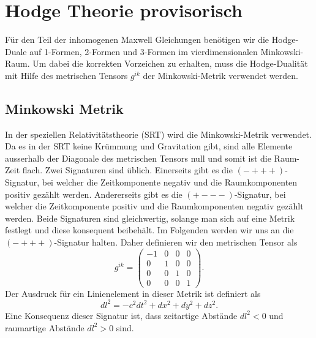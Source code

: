 %
%
%
%
\section{Hodge Theorie provisorisch
\label{maxwell:section:teil1}}

Für den Teil der inhomogenen Maxwell Gleichungen benötigen wir die Hodge-Duale auf 1-Formen, 2-Formen und 3-Formen im vierdimensionalen Minkowski-Raum.
Um dabei die korrekten Vorzeichen zu erhalten, muss die Hodge-Dualität mit Hilfe des metrischen Tensors $g^{ik}$  der Minkowski-Metrik verwendet werden.



\subsection{Minkowski Metrik}
In der speziellen Relativitätstheorie (SRT) wird die Minkowski-Metrik verwendet.
Da es in der SRT keine Krümmung und Gravitation gibt, sind alle Elemente ausserhalb der Diagonale des metrischen Tensors null und somit ist die Raum-Zeit flach.
Zwei Signaturen sind üblich.
Einerseits gibt es die $(-+++)$-Signatur, bei welcher die Zeitkomponente negativ und die Raumkomponenten positiv gezählt werden.
Andererseits gibt es die $(+---)$-Signatur, bei welcher die Zeitkomponente positiv und die Raumkomponenten negativ gezählt werden.
Beide Signaturen sind gleichwertig, solange man sich auf eine Metrik festlegt und diese konsequent beibehält.
Im Folgenden werden wir uns an die $(-+++)$-Signatur halten.
Daher definieren wir den metrischen Tensor als
\begin{equation}
	g^{ik} = \begin{pmatrix}
		-1 & 0 & 0 & 0 \\ 0 & 1 & 0 & 0 \\ 0 & 0 & 1 & 0 \\ 0 & 0 & 0 & 1 
	\end{pmatrix}.
	\label{maxwell:section:teil1:metrik}
\end{equation}
Der Ausdruck für ein Linienelement in dieser Metrik ist definiert als
\begin{equation}
	dl^2 = -c^2dt^2 +dx^2+dy^2+dz^2.
\end{equation}
Eine Konsequenz dieser Signatur ist, dass zeitartige Abstände $dl^2 < 0$ und raumartige Abstände $dl^2 > 0$ sind.


